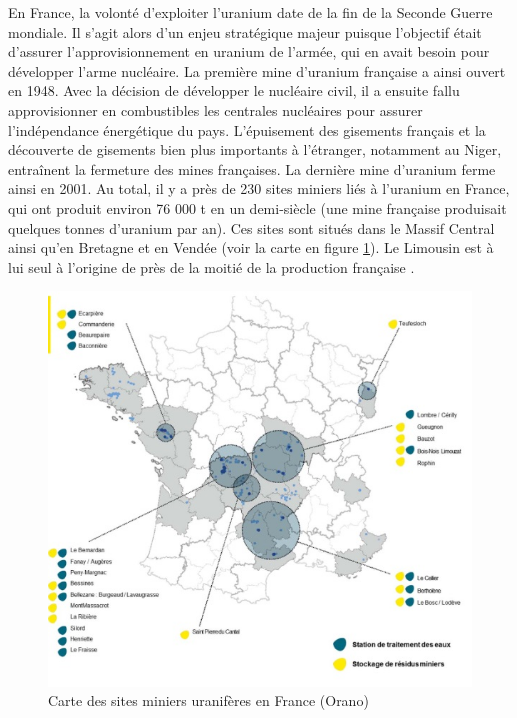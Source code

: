 \documentclass{article}
\begin{document}
En France, la volonté d’exploiter l’uranium date de la fin de la Seconde Guerre mondiale. Il s’agit alors d’un enjeu stratégique majeur puisque l’objectif était d’assurer l’approvisionnement en uranium de l’armée, qui en avait besoin pour développer l’arme nucléaire. La première mine d’uranium française a ainsi ouvert en 1948. Avec la décision de développer le nucléaire civil, il a ensuite fallu approvisionner en combustibles les centrales nucléaires pour assurer l’indépendance énergétique du pays. L’épuisement des gisements français et la découverte de gisements bien plus importants à l’étranger, notamment au Niger, entraînent la fermeture des mines françaises. La dernière mine d’uranium ferme ainsi en 2001. Au total, il y a près de 230 sites miniers liés à l’uranium en France, qui ont produit environ 76 000 t en un demi-siècle (une mine française produisait quelques tonnes d’uranium par an). Ces sites sont situés dans le Massif Central ainsi qu’en Bretagne et en Vendée (voir la carte en figure \ref{fig:sites_orano}). Le Limousin est à lui seul à l’origine de près de la moitié de la production française \cite{descostes_introduction_2020}.

\begin{figure}[H]
    \centering
    \includegraphics[width=\linewidth]{I_A_2.jpg}
    \caption{Carte des sites miniers uranifères en France (Orano)}
    \label{fig:sites_orano}
\end{figure}
\end{document}
